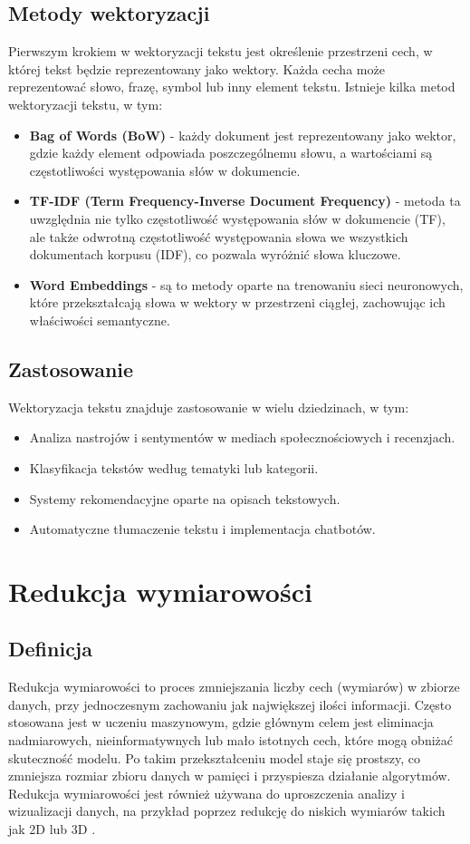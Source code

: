 	\subsection{Metody wektoryzacji}
		Pierwszym krokiem w wektoryzacji tekstu jest określenie przestrzeni cech, w której tekst będzie reprezentowany jako wektory. Każda cecha może reprezentować słowo, frazę, symbol lub inny element tekstu.
		Istnieje kilka metod wektoryzacji tekstu, w tym:
		\begin{itemize}
			\item \textbf{Bag of Words (BoW)} - każdy dokument jest reprezentowany jako wektor, gdzie każdy element odpowiada poszczególnemu słowu, a wartościami są częstotliwości występowania słów w dokumencie.
			\item \textbf{TF-IDF (Term Frequency-Inverse Document Frequency)} - metoda ta uwzględnia nie tylko częstotliwość występowania słów w dokumencie (TF), ale także odwrotną częstotliwość występowania słowa we wszystkich dokumentach korpusu (IDF), co pozwala wyróżnić słowa kluczowe.
			\item \textbf{Word Embeddings} - są to metody oparte na trenowaniu sieci neuronowych, które przekształcają słowa w wektory w przestrzeni ciągłej, zachowując ich właściwości semantyczne.\
		\end{itemize}

	\subsection{Zastosowanie}
		Wektoryzacja tekstu znajduje zastosowanie w wielu dziedzinach, w tym:
		\begin{itemize}
			\item Analiza nastrojów i sentymentów w mediach społecznościowych i recenzjach.
			\item Klasyfikacja tekstów według tematyki lub kategorii.
			\item Systemy rekomendacyjne oparte na opisach tekstowych.
			\item Automatyczne tłumaczenie tekstu i implementacja chatbotów.
		\end{itemize}


\section{Redukcja wymiarowości}

	\subsection{Definicja}
		Redukcja wymiarowości to proces zmniejszania liczby cech (wymiarów) w zbiorze danych, przy jednoczesnym zachowaniu jak największej ilości informacji. Często stosowana jest w uczeniu maszynowym, gdzie głównym celem jest eliminacja nadmiarowych, nieinformatywnych lub mało istotnych cech, które mogą obniżać skuteczność modelu. Po takim przekształceniu model staje się prostszy, co zmniejsza rozmiar zbioru danych w pamięci i przyspiesza działanie algorytmów. Redukcja wymiarowości jest również używana do uproszczenia analizy i wizualizacji danych, na przykład poprzez redukcję do niskich wymiarów takich jak 2D lub 3D \cite{DimensionReduction}.


